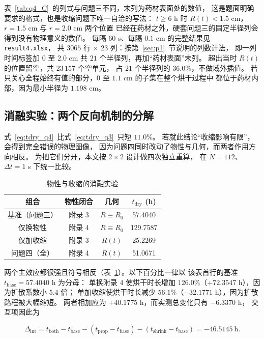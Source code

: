 表~\ref{tab:q4_C}~的列式与问题三不同，末列为药材表面处的数值，
这是题面明确要求的格式，也是收缩问题下唯一自洽的写法：
$t\ge6$ h 时 $R(t)<1.5$ cm，$r=1.5$ cm 与 $r=2.0$ cm 两个位置
已经在药材之外，硬套问题三的固定半径列会得到没有物理意义的数值。
每隔 $60$ s、每隔 $0.1$ cm 的完整结果见 \verb|result4.xlsx|，
共 $3065$ 行 $\times$ $23$ 列：按第~\ref{sec:p1}~节说明的列数计法，
即一列时间标签加 $0$ 至 $2.0$ cm 共 $21$ 个半径列，再加“药材表面”末列。
超出当时 $R(t)$ 的位置留空，共 $23\,157$ 个空单元，
占 $21$ 个半径列的 $36.0\%$，不做域外插值。
若只关心全程始终有值的部分，$0$ 至 $1.1$ cm 的子集在整个烘干过程中
都位于药材内部，因为最小半径为 $1.198$ cm。

\subsection{消融实验：两个反向机制的分解}

式~\eqref{eq:tdry_q4}~比式~\eqref{eq:tdry_q3}~只短 $11.0\%$。
若就此结论“收缩影响有限”，会得到完全错误的物理图像，
因为问题四同时改动了物性与几何，而两者作用方向相反。
为把它们分开，本文按 $2\times2$ 设计做四次独立重算，
在 $N=112$、$\Delta t=1$ s 下统一比较。

\begin{table}[H]
  \centering
  \caption{物性与收缩的消融实验}
  \label{tab:ablation}
  \begin{tabular}{cccc}
  \toprule
  组合 & 物性闭合 & 几何 & $t_{\mathrm{dry}}$ (h) \\
  \midrule
  基准（问题三） & 附录 3 & $R\equiv R_0$ & 57.4040 \\
  仅换物性       & 附录 4 & $R\equiv R_0$ & 129.7587 \\
  仅加收缩       & 附录 3 & $R(t)$        & 25.2269 \\
  问题四（全）   & 附录 4 & $R(t)$        & 51.0671 \\
  \bottomrule
  \end{tabular}
\end{table}

两个主效应都很强且符号相反（表~\ref{tab:ablation}）。以下百分比一律以
该表首行的基准 $t_{\mathrm{base}}=57.4040$ h 为分母：
单换附录 4 使烘干时长增加 $126.0\%$（$+72.3547$ h），因为扩散系数小 $5.4$ 倍；
单加收缩使烘干时长减少 $56.1\%$（$-32.1771$ h），因为扩散路程被大幅缩短。
两者相加应为 $+40.1775$ h，而实测总变化只有 $-6.3370$ h，
交互项因此为

\begin{equation}
\Delta_{\mathrm{int}}
=t_{\mathrm{both}}-t_{\mathrm{base}}
-\left(t_{\mathrm{prop}}-t_{\mathrm{base}}\right)
-\left(t_{\mathrm{shrink}}-t_{\mathrm{base}}\right)
=-46.5145~\text{h}.
\label{eq:interaction}
\end{equation}

